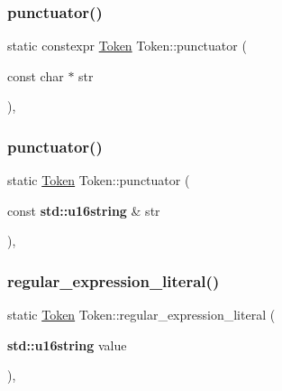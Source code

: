 \subsubsection{\texorpdfstring{punctuator()}{punctuator()}\hspace{0.1cm}{\footnotesize\ttfamily [1/2]}}
{\footnotesize\ttfamily static constexpr \hyperlink{class_token}{Token} Token\+::punctuator (\begin{DoxyParamCaption}\item[{const char $\ast$}]{str }\end{DoxyParamCaption})\hspace{0.3cm}{\ttfamily [inline]}, {\ttfamily [static]}}

\mbox{\label{class_token_a958d66fdb60bf55bc8ac8c4ea197e8b8}} 
\subsubsection{\texorpdfstring{punctuator()}{punctuator()}\hspace{0.1cm}{\footnotesize\ttfamily [2/2]}}
{\footnotesize\ttfamily static \hyperlink{class_token}{Token} Token\+::punctuator (\begin{DoxyParamCaption}\item[{const \textbf{ std\+::u16string} \&}]{str }\end{DoxyParamCaption})\hspace{0.3cm}{\ttfamily [inline]}, {\ttfamily [static]}}

\mbox{\label{class_token_a04cbc6f06b61c2297af210b5dc0f730b}} 
\subsubsection{\texorpdfstring{regular\+\_\+expression\+\_\+literal()}{regular\_expression\_literal()}}
{\footnotesize\ttfamily static \hyperlink{class_token}{Token} Token\+::regular\+\_\+expression\+\_\+literal (\begin{DoxyParamCaption}\item[{\textbf{ std\+::u16string}}]{value }\end{DoxyParamCaption})\hspace{0.3cm}{\ttfamily [inline]}, {\ttfamily [static]}}


